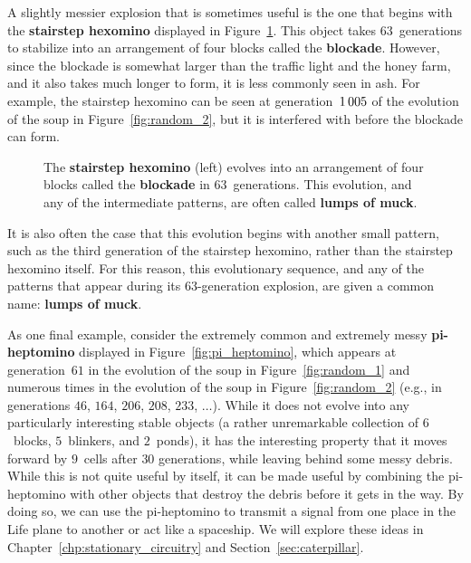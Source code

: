 A slightly messier explosion that is sometimes useful is the one that begins with the \textbf{stairstep hexomino} displayed in Figure~\ref{fig:stairstep_hexomino}. This object takes $63$~generations to stabilize into an arrangement of four blocks called the \textbf{blockade}. However, since the blockade is somewhat larger than the traffic light and the honey farm, and it also takes much longer to form, it is less commonly seen in ash. For example, the stairstep hexomino can be seen at generation~$1{\,}005$ of the evolution of the soup in Figure~\ref{fig:random_2}, but it is interfered with before the blockade can form.

\begin{figure}[!htb]
	\centering
	\caption{The \textbf{stairstep hexomino} (left) evolves into an arrangement of four blocks called the \textbf{blockade} in $63$~generations. This evolution, and any of the intermediate patterns, are often called \textbf{lumps of muck}.}\label{fig:stairstep_hexomino}
\end{figure}

It is also often the case that this evolution begins with another small pattern, such as the third generation of the stairstep hexomino, rather than the stairstep hexomino itself. For this reason, this evolutionary sequence, and any of the patterns that appear during its $63$-generation explosion, are given a common name: \textbf{lumps of muck}.

As one final example, consider the extremely common and extremely messy \textbf{pi-heptomino} displayed in Figure~\ref{fig:pi_heptomino}, which appears at generation~$61$ in the evolution of the soup in Figure~\ref{fig:random_1} and numerous times in the evolution of the soup in Figure~\ref{fig:random_2} (e.g., in generations $46$, $164$, $206$, $208$, $233$, $\ldots$). While it does not evolve into any particularly interesting stable objects (a rather unremarkable collection of $6$~blocks, $5$~blinkers, and $2$~ponds), it has the interesting property that it moves forward by $9$~cells after $30$ generations, while leaving behind some messy debris. While this is not quite useful by itself, it can be made useful by combining the pi-heptomino with other objects that destroy the debris before it gets in the way. By doing so, we can use the pi-heptomino to transmit a signal from one place in the Life plane to another or act like a spaceship. We will explore these ideas in Chapter~\ref{chp:stationary_circuitry} and Section~\ref{sec:caterpillar}.

